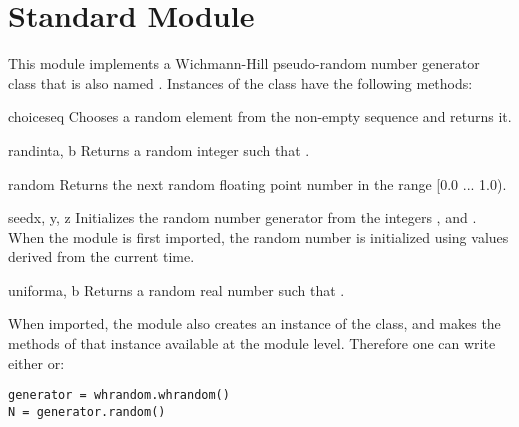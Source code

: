 \section{Standard Module }
\label{module-whrandom}

This module implements a Wichmann-Hill pseudo-random number generator
class that is also named .  Instances of the
 class have the following methods:

\begin{funcdesc}{choice}{seq}
Chooses a random element from the non-empty sequence  and returns it.
\end{funcdesc}

\begin{funcdesc}{randint}{a, b}
Returns a random integer  such that .
\end{funcdesc}

\begin{funcdesc}{random}{}
Returns the next random floating point number in the range [0.0 ... 1.0).
\end{funcdesc}

\begin{funcdesc}{seed}{x, y, z}
Initializes the random number generator from the integers
,
and
.
When the module is first imported, the random number is initialized
using values derived from the current time.
\end{funcdesc}

\begin{funcdesc}{uniform}{a, b}
Returns a random real number  such that .
\end{funcdesc}

When imported, the  module also creates an instance of
the  class, and makes the methods of that instance
available at the module level.  Therefore one can write either 
 or:
\begin{verbatim}
generator = whrandom.whrandom()
N = generator.random()
\end{verbatim}
%
\begin{seealso}
\end{seealso}
